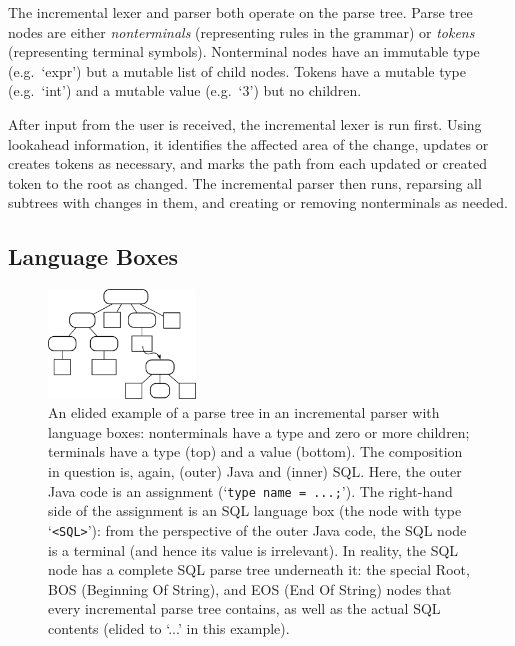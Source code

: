 \documentclass[sigplan,screen]{acmart}
\begin{document}
The incremental lexer and parser both operate on the parse tree. Parse tree nodes
are either \emph{nonterminals} (representing rules in the grammar) or
\emph{tokens} (representing terminal symbols). Nonterminal nodes have an
immutable type (e.g.~`expr') but a mutable list of child nodes.
Tokens have a mutable type (e.g.~`int')
and a mutable value (e.g.~`3') but no children.

After input from the user is received, the incremental lexer is run first.
Using lookahead information, it identifies the affected area of the change,
updates or creates tokens as necessary, and marks the path from each updated or
created token to the root as changed. The incremental parser then runs,
reparsing all subtrees with changes in them, and creating or removing
nonterminals as needed.


\subsection{Language Boxes}

\begin{figure}[t]
\begin{center}
\includegraphics[width=0.35\textwidth]{images/lbox_parsetree}
\caption{An elided example of a parse tree in an incremental parser with
  language boxes: nonterminals have a type and zero or more children; terminals
  have a type (top) and a value (bottom). The composition in question is,
  again, (outer) Java and (inner) SQL. Here, the outer Java code is an
  assignment (`\texttt{type name = ...;}'). The right-hand side of the
  assignment is an SQL language box (the node with type `\texttt{<SQL>}'): from the
  perspective of the outer Java code, the SQL node is a terminal (and hence its
  value is irrelevant). In reality, the SQL node has a complete SQL parse tree
  underneath it: the special Root, BOS (Beginning Of String), and EOS (End Of
  String) nodes that every incremental parse tree contains, as well as the actual
  SQL contents (elided to `...' in this example). }
\label{fig:lboxtree}
\end{center}
\end{figure}
\end{document}
